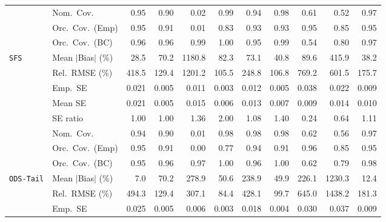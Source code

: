 \begin{landscape}
\begin{longtable}{llrrrrrrrrr}
 & Nom.\ Cov. & \cellcolor{rankone}0.95 & 0.90 & 0.02 & 0.99 & \cellcolor{ranktwo}0.94 & 0.98 & 0.61 & 0.52 & \cellcolor{rankthree}0.97 \\
 & Orc.\ Cov.\ (Emp) & \cellcolor{rankone}0.95 & \cellcolor{rankthree}0.91 & 0.01 & 0.83 & \cellcolor{ranktwo}0.93 & \cellcolor{ranktwo}0.93 & \cellcolor{rankone}0.95 & 0.85 & \cellcolor{rankone}0.95 \\
 & Orc.\ Cov.\ (BC) & \cellcolor{ranktwo}0.96 & \cellcolor{ranktwo}0.96 & 0.99 & 1.00 & \cellcolor{rankone}0.95 & 0.99 & 0.54 & 0.80 & \cellcolor{rankthree}0.97 \\
\addlinespace[2pt]
\quad \texttt{SFS} & Mean $|$Bias$|$ (\%) & \cellcolor{rankone}28.5 & 70.2 & 1180.8 & 82.3 & 73.1 & \cellcolor{rankthree}40.8 & 89.6 & 415.9 & \cellcolor{ranktwo}38.2 \\
 & Rel.\ RMSE (\%) & 418.5 & \cellcolor{rankthree}129.4 & 1201.2 & \cellcolor{rankone}105.5 & 248.8 & \cellcolor{ranktwo}106.8 & 769.2 & 601.5 & 175.7 \\
 & Emp.\ SE & 0.021 & 0.005 & 0.011 & 0.003 & 0.012 & 0.005 & 0.038 & 0.022 & 0.009 \\
 & Mean SE & 0.021 & 0.005 & 0.015 & 0.006 & 0.013 & 0.007 & 0.009 & 0.014 & 0.010 \\
 & SE ratio & \cellcolor{rankone}1.00 & \cellcolor{rankone}1.00 & 1.36 & 2.00 & \cellcolor{ranktwo}1.08 & 1.40 & 0.24 & 0.64 & \cellcolor{rankthree}1.11 \\
 & Nom.\ Cov. & \cellcolor{rankone}0.94 & 0.90 & 0.01 & \cellcolor{rankthree}0.98 & \cellcolor{rankthree}0.98 & \cellcolor{rankthree}0.98 & 0.62 & 0.56 & \cellcolor{ranktwo}0.97 \\
 & Orc.\ Cov.\ (Emp) & \cellcolor{rankone}0.95 & \cellcolor{rankthree}0.91 & 0.00 & 0.77 & \cellcolor{ranktwo}0.94 & \cellcolor{rankthree}0.91 & \cellcolor{ranktwo}0.96 & 0.85 & \cellcolor{rankone}0.95 \\
 & Orc.\ Cov.\ (BC) & \cellcolor{rankone}0.95 & \cellcolor{ranktwo}0.96 & \cellcolor{rankthree}0.97 & 1.00 & \cellcolor{ranktwo}0.96 & 1.00 & 0.62 & 0.79 & 0.98 \\
\addlinespace[2pt]
\quad \texttt{ODS-Tail} & Mean $|$Bias$|$ (\%) & \cellcolor{rankone}7.0 & 70.2 & 278.9 & 50.6 & 238.9 & \cellcolor{rankthree}49.9 & 226.1 & 1230.3 & \cellcolor{ranktwo}12.4 \\
 & Rel.\ RMSE (\%) & 494.3 & \cellcolor{rankthree}129.4 & 307.1 & \cellcolor{rankone}84.4 & 428.1 & \cellcolor{ranktwo}99.7 & 645.0 & 1438.2 & 181.3 \\
 & Emp.\ SE & 0.025 & 0.005 & 0.006 & 0.003 & 0.018 & 0.004 & 0.030 & 0.037 & 0.009 \\

\end{longtable}
\end{landscape}
